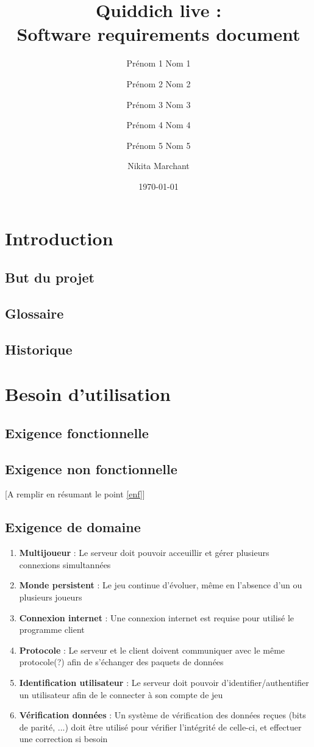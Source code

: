 \documentclass[a4paper]{article}
\title{Quiddich live : \\Software requirements document}
\author{Prénom 1 Nom 1 \and Prénom 2 Nom 2 \and Prénom 3 Nom 3 \and
Prénom 4 Nom 4 \and Prénom 5 Nom 5 \and Nikita Marchant}
\date{\today}
\begin{document}
\maketitle

\section{Introduction}
\subsection{But du projet}
\subsection{ Glossaire}
\subsection{Historique}
\section{Besoin d'utilisation}
\subsection{Exigence fonctionnelle}
\subsection{Exigence non fonctionnelle}
[A remplir en résumant le point \ref{enf}]
\subsection{Exigence de domaine}
\begin{enumerate}
\item \textbf{Multijoueur} : Le serveur doit pouvoir acceuillir et gérer plusieurs connexions simultannées
\item \textbf{Monde persistent} : Le jeu continue d'évoluer, même en l'absence d'un ou plusieurs joueurs
\item \textbf{Connexion internet} : Une connexion internet est requise pour utilisé le programme client
\item \textbf{Protocole} : Le serveur et le client doivent communiquer avec le même protocole(?) afin de s'échanger des paquets de données
\item \textbf{Identification utilisateur} : Le serveur doit pouvoir d'identifier/authentifier un utilisateur afin de le connecter à son compte de jeu
\item \textbf{Vérification données} : Un système de vérification des données reçues (bits de parité, ...) doit être utilisé pour vérifier l'intégrité de celle-ci, et effectuer une correction si besoin
\end{enumerate}
\end{document}
